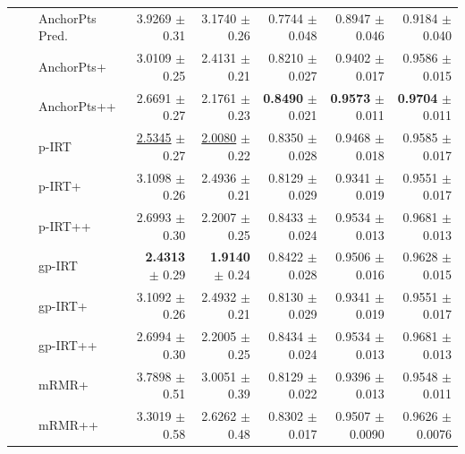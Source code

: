 \begin{longtable}{llp{}rrrrr}
 &  & AnchorPts Pred. & 3.9269 {\scriptsize $\pm$ 0.31} & 3.1740 {\scriptsize $\pm$ 0.26} & 0.7744 {\scriptsize $\pm$ 0.048} & 0.8947 {\scriptsize $\pm$ 0.046} & 0.9184 {\scriptsize $\pm$ 0.040} \\
 &  & AnchorPts+ & 3.0109 {\scriptsize $\pm$ 0.25} & 2.4131 {\scriptsize $\pm$ 0.21} & 0.8210 {\scriptsize $\pm$ 0.027} & 0.9402 {\scriptsize $\pm$ 0.017} & 0.9586 {\scriptsize $\pm$ 0.015} \\
 &  & AnchorPts++ & 2.6691 {\scriptsize $\pm$ 0.27} & 2.1761 {\scriptsize $\pm$ 0.23} & \textbf{0.8490} {\scriptsize $\pm$ 0.021} & \textbf{0.9573} {\scriptsize $\pm$ 0.011} & \textbf{0.9704} {\scriptsize $\pm$ 0.011} \\
 &  & p-IRT & \underline{2.5345} {\scriptsize $\pm$ 0.27} & \underline{2.0080} {\scriptsize $\pm$ 0.22} & 0.8350 {\scriptsize $\pm$ 0.028} & 0.9468 {\scriptsize $\pm$ 0.018} & 0.9585 {\scriptsize $\pm$ 0.017} \\
 &  & p-IRT+ & 3.1098 {\scriptsize $\pm$ 0.26} & 2.4936 {\scriptsize $\pm$ 0.21} & 0.8129 {\scriptsize $\pm$ 0.029} & 0.9341 {\scriptsize $\pm$ 0.019} & 0.9551 {\scriptsize $\pm$ 0.017} \\
 &  & p-IRT++ & 2.6993 {\scriptsize $\pm$ 0.30} & 2.2007 {\scriptsize $\pm$ 0.25} & 0.8433 {\scriptsize $\pm$ 0.024} & 0.9534 {\scriptsize $\pm$ 0.013} & 0.9681 {\scriptsize $\pm$ 0.013} \\
 &  & gp-IRT & \textbf{2.4313} {\scriptsize $\pm$ 0.29} & \textbf{1.9140} {\scriptsize $\pm$ 0.24} & 0.8422 {\scriptsize $\pm$ 0.028} & 0.9506 {\scriptsize $\pm$ 0.016} & 0.9628 {\scriptsize $\pm$ 0.015} \\
 &  & gp-IRT+ & 3.1092 {\scriptsize $\pm$ 0.26} & 2.4932 {\scriptsize $\pm$ 0.21} & 0.8130 {\scriptsize $\pm$ 0.029} & 0.9341 {\scriptsize $\pm$ 0.019} & 0.9551 {\scriptsize $\pm$ 0.017} \\
 &  & gp-IRT++ & 2.6994 {\scriptsize $\pm$ 0.30} & 2.2005 {\scriptsize $\pm$ 0.25} & 0.8434 {\scriptsize $\pm$ 0.024} & 0.9534 {\scriptsize $\pm$ 0.013} & 0.9681 {\scriptsize $\pm$ 0.013} \\
 &  & mRMR+ & 3.7898 {\scriptsize $\pm$ 0.51} & 3.0051 {\scriptsize $\pm$ 0.39} & 0.8129 {\scriptsize $\pm$ 0.022} & 0.9396 {\scriptsize $\pm$ 0.013} & 0.9548 {\scriptsize $\pm$ 0.011} \\
 &  & mRMR++ & 3.3019 {\scriptsize $\pm$ 0.58} & 2.6262 {\scriptsize $\pm$ 0.48} & 0.8302 {\scriptsize $\pm$ 0.017} & 0.9507 {\scriptsize $\pm$ 0.0090} & 0.9626 {\scriptsize $\pm$ 0.0076} \\

\end{longtable}
